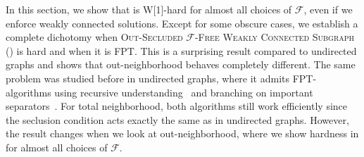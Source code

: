 \label{chap:hardness}


\begin{comment}
In this section, we consider finding secluded $\mathcal{F}$-free subgraphs, a problem that received significant attention in the undirected setting and was proven FPT with different algorithms~\cite{golovach2020finding,jansen2023single}. For out-neighborhoods, the problem is defined as follows.

\begin{tcolorbox}[enhanced,title={\color{black} {\free{}}}, colback=white, boxrule=0.4pt,
	attach boxed title to top left={xshift=.3cm, yshift*=-2.5mm},
	boxed title style={size=small,frame hidden,colback=white}]
	
	\textbf{Input:}  
  A directed graph $G$, a weight function $\wOp \colon \ve{G} \to \N$, and integers $w,k \in \N$\\

	\textbf{Output:}
  Decide if there is a set $S \subseteq \ve{G}$ such that $\induced{G}{S}$ includes no $F \in \mathcal{F}$ as an induced subgraph, $\abs{\outNei{S}} \le k$, and $\w{S} \ge w$.
\end{tcolorbox}
\end{comment}

In this section, we show that \free{} is W[1]-hard for almost all choices of $\mathcal{F}$, even if we enforce weakly connected solutions. Except for some obscure cases, we establish a complete dichotomy when \textsc{Out-Secluded $\mathcal{F}$-Free Weakly Connected Subgraph} (\prob{}) is hard and when it is FPT. This is a surprising result compared to undirected graphs and shows that out-neighborhood behaves completely different. 
The same problem was studied before in undirected graphs, where it admits FPT-algorithms using recursive understanding~\cite{golovach2020finding} and branching on important separators~\cite{jansen2023single}. For total neighborhood, both algorithms still work efficiently since the seclusion condition acts exactly the same as in undirected graphs. However, the result changes when we look at out-neighborhood, where we show hardness in  for almost all choices of $\mathcal{F}$. 


